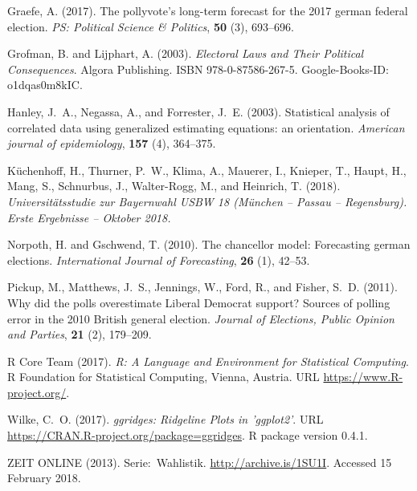 \documentclass[smallextended]{svjour3}      %
\begin{document}
\begin{thebibliography}{13}
{\rm Graefe, A.} (2017).
\newblock The pollyvote’s long-term forecast for the 2017 german federal
  election.
\newblock \emph{PS: Political Science \& Politics}, {\bf 50} (3),
   693--696.

{\rm Grofman, B. {\rm and} Lijphart, A.} (2003).
\newblock \emph{Electoral {Laws} and {Their} {Political} {Consequences}}.
\newblock Algora Publishing.
\newblock ISBN 978-0-87586-267-5.
\newblock Google-Books-ID: o1dqas0m8kIC.

{\rm Hanley, J.~A., Negassa, A., {\rm and} Forrester, J.~E.} (2003).
\newblock Statistical analysis of correlated data using generalized estimating
  equations: an orientation.
\newblock \emph{American journal of epidemiology}, {\bf 157} (4),
   364--375.

{\rm K\"uchenhoff, H., Thurner, P.~W., Klima, A., Mauerer, I., Knieper, T., Haupt, H., Mang, S., Schnurbus, J., Walter-Rogg, M., {\rm and} Heinrich, T.} (2018).
\newblock \emph{Universit\"atsstudie zur Bayernwahl USBW 18 (M\"unchen -- Passau -- Regensburg). Erste Ergebnisse -- Oktober 2018.}

{\rm Norpoth, H. {\rm and} Gschwend, T.} (2010).
\newblock The chancellor model: Forecasting german elections.
\newblock \emph{International Journal of Forecasting}, {\bf 26} (1),
   42--53.

{\rm Pickup, M., Matthews, J.~S., Jennings, W., Ford, R., {\rm and} Fisher, S.~D.} (2011).
\newblock Why did the polls overestimate Liberal Democrat support? Sources of polling error in the 2010 British general election.
\newblock \emph{Journal of Elections, Public Opinion and Parties}, {\bf 21} (2),
   179--209.

{\rm {R Core Team}} (2017).
\newblock \emph{R: A Language and Environment for Statistical Computing}.
\newblock R Foundation for Statistical Computing, Vienna, Austria.
\newblock URL \url{https://www.R-project.org/}.

{\rm Wilke, C.~O.} (2017).
\newblock \emph{ggridges: Ridgeline Plots in 'ggplot2'}.
\newblock URL \url{https://CRAN.R-project.org/package=ggridges}.
\newblock R package version 0.4.1.

{\rm {ZEIT ONLINE}} (2013).
\newblock Serie:~{W}ahlistik.
\newblock \url{http://archive.is/1SU1I}.
\newblock Accessed 15 February 2018.

\end{thebibliography}
\end{document}
